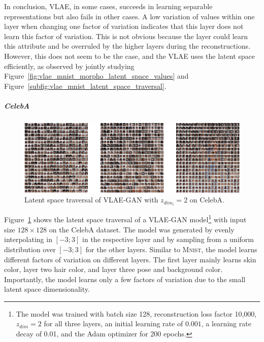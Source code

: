 In conclusion, \ac{VLAE}, in some cases, succeeds in learning separable representations but also fails in other cases.
A low variation of values within one layer when changing one factor of variation indicates that this layer does not learn this factor of variation.
This is not obvious because the layer could learn this attribute and be overruled by the higher layers during the reconstructions.
However, this does not seem to be the case, and the \ac{VLAE} uses the latent space efficiently, as observed by jointly studying Figure~\ref{fig:vlae_mnist_morpho_latent_space_values} and Figure~\ref{subfig:vlae_mnist_latent_space_traversal}.

\subparagraph{CelebA}

\begin{figure}
    \centering
    \includegraphics[width=\textwidth]{images/latent_space_traversals/vlae_gan_celeba.png}
    \caption[\ac{VLAE}-\ac{GAN} on CelebA: Latent Space Traversal]{Latent space traversal of \ac{VLAE}-\ac{GAN} with $z_{dim_i}=2$ on CelebA.}
    \label{fig:celeba_latent_space_traversal}
\end{figure}

Figure~\ref{fig:celeba_latent_space_traversal} shows the latent space traversal of a \ac{VLAE}-\ac{GAN} model\footnote{The model was trained with batch size 128, reconstruction loss factor 10,000, $z_{dim}=2$ for all three layers, an initial learning rate of $0.001$, a learning rate decay of 0.01, and the Adam optimizer for 200 epochs.} with input size $128\times 128$ on the CelebA dataset.
The model was generated by evenly interpolating in $[-3; 3]$ in the respective layer and by sampling from a uniform distribution over $[-3; 3]$ for the other layers.
Similar to \textsc{Mnist}, the model learns different factors of variation on different layers.
The first layer mainly learns skin color, layer two hair color, and layer three pose and background color.
Importantly, the model learns only a few factors of variation due to the small latent space dimensionality.

